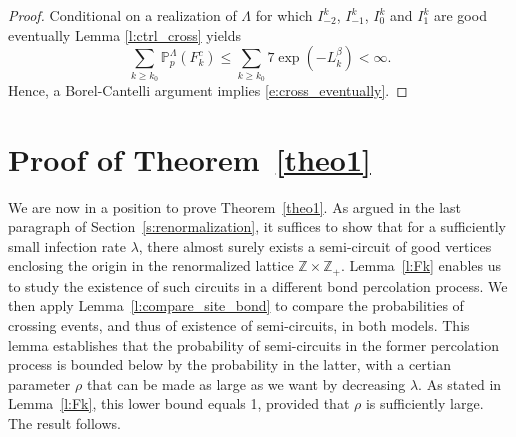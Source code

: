 \documentclass[a4paper,oneside,12pt]{amsart}
\renewcommand{\leq}{\leqslant}
\renewcommand{\geq}{\geqslant}
\theoremstyle{plain}
\theoremstyle{definition}
\theoremstyle{remark}
\begin{document}
\begin{proof}


Conditional on a realization of $\Lambda$ for which $I^k_{-2}$, $I^k_{-1}$, $I^k_{0}$ and $I^k_1$ are good eventually 
Lemma \ref{l:ctrl_cross} yields
\begin{equation}
\sum_{k\geq k_0} \mathbb P_{p}^{\Lambda} (F_k^c) \leq \sum_{k\geq k_0} 7 \exp(-L_k^\beta) < \infty.
\end{equation}
Hence, a Borel-Cantelli argument implies \eqref{e:cross_eventually}.


\end{proof}

\section{Proof of Theorem~\ref{theo1}}

We are now in a position to prove Theorem~\ref{theo1}. 
As argued in the last paragraph of Section~\ref{s:renormalization}, it suffices to show that for a sufficiently small infection rate $\lambda$, there almost surely exists a semi-circuit of good vertices enclosing the origin in the renormalized lattice $\mathbb{Z} \times \mathbb{Z}_+$. 
Lemma~\ref{l:Fk} enables us to study the existence of such circuits in a different bond percolation process.
We then apply Lemma~\ref{l:compare_site_bond} to compare the probabilities of crossing events, and thus of existence of semi-circuits, in both models. 
This lemma establishes that the probability of semi-circuits in the former percolation process is bounded below by the probability in the latter, with a certian parameter $\rho$ that can be made as large as we want by decreasing $\lambda$. 
As stated in Lemma~\ref{l:Fk}, this lower bound equals 1, provided that $\rho$ is sufficiently large.
The result follows.
\end{document}
